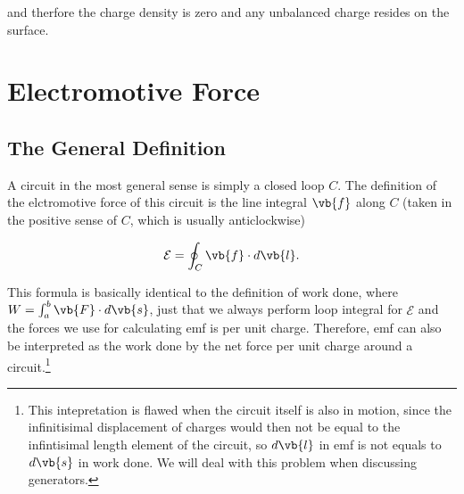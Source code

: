 \documentclass[english,a4paper,12pt]{report}
\begin{document}
and therfore the charge density is zero and any unbalanced charge resides on the surface.



\section{Electromotive Force}

\subsection{The General Definition}

A circuit in the most general sense is simply a closed loop \(C\). The definition of the elctromotive force of this circuit is the line integral \(\vb{f} \) along \(C\) (taken in the positive sense of \(C\), which is usually anticlockwise)  

\begin{equation}
    \mathcal{E} = \oint_{C}  \vb{f} \cdot d \vb{l} .
\end{equation}

\begin{center}
\end{center}

This formula is basically identical to the definition of work done, where \(W = \int_{a}^{b} \vb{F} \cdot d \vb{s}  \), just that we always perform loop integral for \(\mathcal{E}\) and the forces we use for calculating emf is per unit charge. Therefore, emf can also be interpreted as the work done by the net force per unit charge around a circuit.\footnote{This intepretation is flawed when the circuit itself is also in motion, since the infinitisimal displacement of charges would then not be equal to the infintisimal length element of the circuit, so \(d \vb{l} \) in emf is not equals to \(d \vb{s} \) in work done. We will deal with this problem when discussing generators.}
\end{document}
